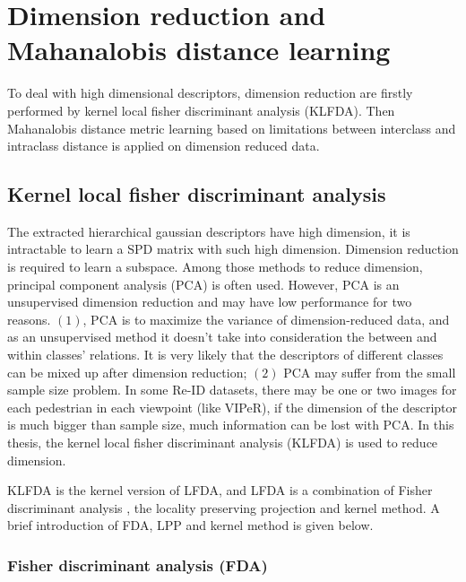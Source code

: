 \chapter{Dimension reduction and Mahanalobis distance learning}
To deal with high dimensional descriptors, dimension reduction are firstly performed by kernel local fisher discriminant analysis (KLFDA). Then Mahanalobis distance metric learning based on limitations between interclass and intraclass distance is applied on dimension reduced data.
\section{Kernel local fisher discriminant analysis}
The extracted hierarchical gaussian descriptors have high dimension, it is intractable to learn a SPD matrix with such high dimension. Dimension reduction is required to learn a subspace.
Among those methods to reduce dimension, principal component analysis (PCA) is often used. However, PCA is an unsupervised dimension reduction and may have low performance for two reasons. $(1)$, PCA is to maximize the variance of dimension-reduced data, and as an unsupervised method it doesn't take into consideration the between and within classes' relations. It is very likely that the descriptors of different classes can be mixed up after dimension reduction; $(2)$ PCA may suffer from the small sample size problem. In some Re-ID datasets, there may be one or two images for each pedestrian in each viewpoint (like VIPeR), if the dimension of the descriptor is much bigger than sample size, much information can be lost with PCA. In this thesis, the kernel local fisher discriminant analysis (KLFDA) is used to reduce dimension. 

KLFDA is the kernel version of LFDA, and LFDA is a combination of Fisher discriminant analysis \cite{LFDA}, the locality preserving projection \cite{LPP} and kernel method. A brief introduction of FDA, LPP and kernel method is given below.
\subsection{Fisher discriminant analysis (FDA)}

